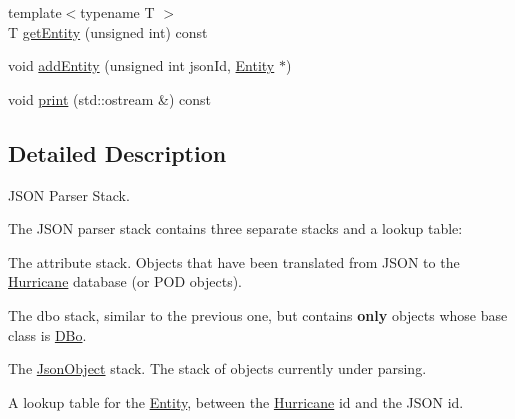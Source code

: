 \begin{DoxyCompactItemize}
\item 
{\footnotesize template$<$typename T $>$ }\\T \hyperlink{classHurricane_1_1JsonStack_a2113cc70527e6695d8cf11bcefd0b679}{get\-Entity} (unsigned int) const 
\item 
void \hyperlink{classHurricane_1_1JsonStack_a421fdf4a3bab01d75f0aab292cc574d0}{add\-Entity} (unsigned int json\-Id, \hyperlink{classHurricane_1_1Entity}{Entity} $\ast$)
\item 
void \hyperlink{classHurricane_1_1JsonStack_a499df92d9e40e41c8bf145b41753cbc8}{print} (std\-::ostream \&) const 
\end{DoxyCompactItemize}


\subsection{Detailed Description}
J\-S\-O\-N Parser Stack. 

The J\-S\-O\-N parser stack contains three separate stacks and a lookup table\-:
\begin{DoxyEnumerate}
\item The {\ttfamily attribute} stack. Objects that have been translated from J\-S\-O\-N to the \hyperlink{namespaceHurricane}{Hurricane} database (or P\-O\-D objects).
\item The {\ttfamily dbo} stack, similar to the previous one, but contains {\bfseries only} objects whose base class is \hyperlink{classHurricane_1_1DBo}{D\-Bo}.
\item The \hyperlink{classHurricane_1_1JsonObject}{Json\-Object} stack. The stack of objects currently under parsing.
\item A lookup table for the \hyperlink{classHurricane_1_1Entity}{Entity}, between the \hyperlink{namespaceHurricane}{Hurricane} {\ttfamily id} and the J\-S\-O\-N {\ttfamily id}. 
\end{DoxyEnumerate}

